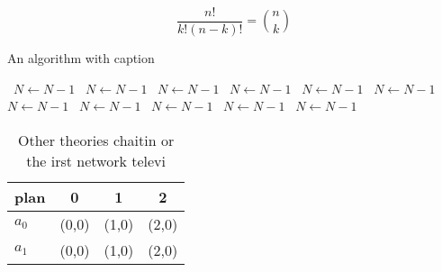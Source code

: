 \documentclass[a4paper]{article}
\begin{document}
\[ \frac{n!}{k!(n-k)!} = \binom{n}{k} \]

\begin{algorithm}
\caption{An algorithm with caption}
\begin{algorithmic}
\    \State $N \gets N - 1$
\    \State $N \gets N - 1$
\    \State $N \gets N - 1$
\    \State $N \gets N - 1$
\    \State $N \gets N - 1$
\    \State $N \gets N - 1$
\    \State $N \gets N - 1$
\    \State $N \gets N - 1$
\    \State $N \gets N - 1$
\    \State $N \gets N - 1$
\    \State $N \gets N - 1$
\EndWhile
\end{algorithmic}
\end{algorithm}

\begin{table}
\begin{adjustbox}{width=0.6\columnwidth}
\begin{tabular}{|l|l|l|l|}
\hline
\textbf{plan} & \multicolumn{1}{c|}{\textbf{0}} & \multicolumn{1}{c|}{\textbf{1}} & \multicolumn{1}{c|}{\textbf{2}} \\ \hline
\textbf{$a_0$}  & (0,0) & (1,0) & (2,0) \\ \hline
\textbf{$a_1$}  & (0,0) & (1,0) & (2,0) \\ \hline
\end{tabular}
\end{adjustbox}
\caption{Other theories chaitin or the irst network televi
}
\end{table}
\end{document}
